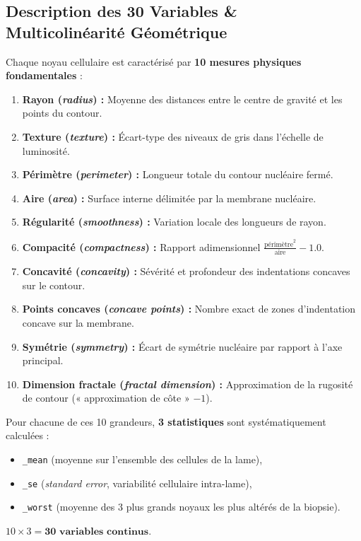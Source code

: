 \documentclass[10pt,a4paper]{article}
\begin{document}
\subsection{Description des 30 Variables \& Multicolinéarité Géométrique}
Chaque noyau cellulaire est caractérisé par \textbf{10 mesures physiques fondamentales} :
\begin{enumerate}[itemsep=1pt, parsep=0pt]
	\item \textbf{Rayon (\textit{radius}) :} Moyenne des distances entre le centre de gravité et les points du contour.
	\item \textbf{Texture (\textit{texture}) :} Écart-type des niveaux de gris dans l'échelle de luminosité.
	\item \textbf{Périmètre (\textit{perimeter}) :} Longueur totale du contour nucléaire fermé.
	\item \textbf{Aire (\textit{area}) :} Surface interne délimitée par la membrane nucléaire.
	\item \textbf{Régularité (\textit{smoothness}) :} Variation locale des longueurs de rayon.
	\item \textbf{Compacité (\textit{compactness}) :} Rapport adimensionnel $\frac{\text{périmètre}^2}{\text{aire}} - 1.0$.
	\item \textbf{Concavité (\textit{concavity}) :} Sévérité et profondeur des indentations concaves sur le contour.
	\item \textbf{Points concaves (\textit{concave points}) :} Nombre exact de zones d'indentation concave sur la membrane.
	\item \textbf{Symétrie (\textit{symmetry}) :} Écart de symétrie nucléaire par rapport à l'axe principal.
	\item \textbf{Dimension fractale (\textit{fractal dimension}) :} Approximation de la rugosité de contour (« approximation de côte » $- 1$).
\end{enumerate}
Pour chacune de ces 10 grandeurs, \textbf{3 statistiques} sont systématiquement calculées :
\begin{itemize}[itemsep=1pt, parsep=0pt]
	\item \texttt{\_mean} (moyenne sur l'ensemble des cellules de la lame),
	\item \texttt{\_se} (\textit{standard error}, variabilité cellulaire intra-lame),
	\item \texttt{\_worst} (moyenne des 3 plus grands noyaux les plus altérés de la biopsie).
\end{itemize}
$10 \times 3 = \mathbf{30\text{ variables continus}}$.
\end{document}

